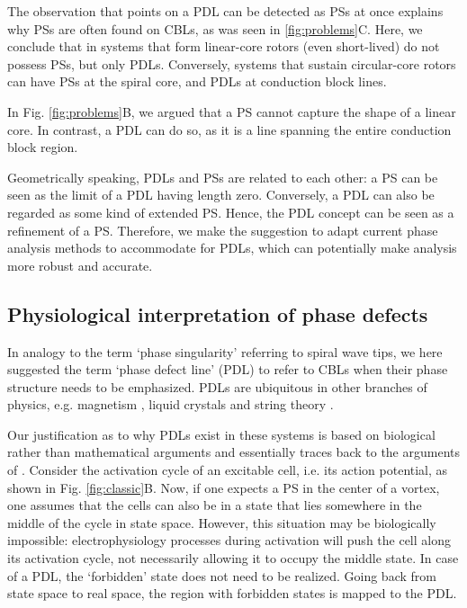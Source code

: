 \documentclass{article}
\begin{document}
The observation that points on a PDL can be detected as PSs at once explains why PSs are often found on CBLs, as was seen in \ref{fig:problems}C. Here, we conclude that in systems that form linear-core rotors (even short-lived) do not possess PSs, but only PDLs. Conversely, systems that sustain circular-core rotors can have PSs at the spiral core, and PDLs at conduction block lines. 

In Fig. \ref{fig:problems}B, we argued that a PS cannot capture the shape of a linear core. In contrast, a PDL can do so, as it is a line spanning the entire conduction block region. 

Geometrically speaking, PDLs and PSs are related to each other: a PS can be seen as the limit of a PDL having length zero. Conversely, a PDL can also be regarded as some kind of extended PS. Hence, the PDL concept can be seen as a refinement of a PS. Therefore, we make the suggestion to adapt current phase analysis methods to accommodate for PDLs, which can potentially make analysis more robust and accurate.  

\subsection{Physiological interpretation of phase defects}

In analogy to the term `phase singularity' referring to spiral wave tips, we here suggested the term `phase defect line' (PDL) to refer to CBLs when their phase structure needs to be emphasized. PDLs are ubiquitous in other branches of physics, e.g. magnetism \citep{Landau:1935}, liquid crystals \citep{Williams:1963} and string theory \citep{Vilenkin:1985}.

Our justification as to why PDLs exist in these systems is based on biological rather than mathematical arguments and essentially traces back to the arguments of \cite{Winfree:1974}. Consider the activation cycle of an excitable cell, i.e. its action potential, as shown in Fig. \ref{fig:classic}B. Now, if one expects a PS in the center of a vortex, one assumes that the cells can also be in a state that lies somewhere in the middle of the cycle in state space. However, this situation may be biologically impossible: electrophysiology processes during activation will push the cell along its activation cycle, not necessarily allowing it to occupy the middle state. In case of a PDL, the `forbidden' state does not need to be realized. Going back from state space to real space, the region with forbidden states is mapped to the PDL. 
\end{document}

